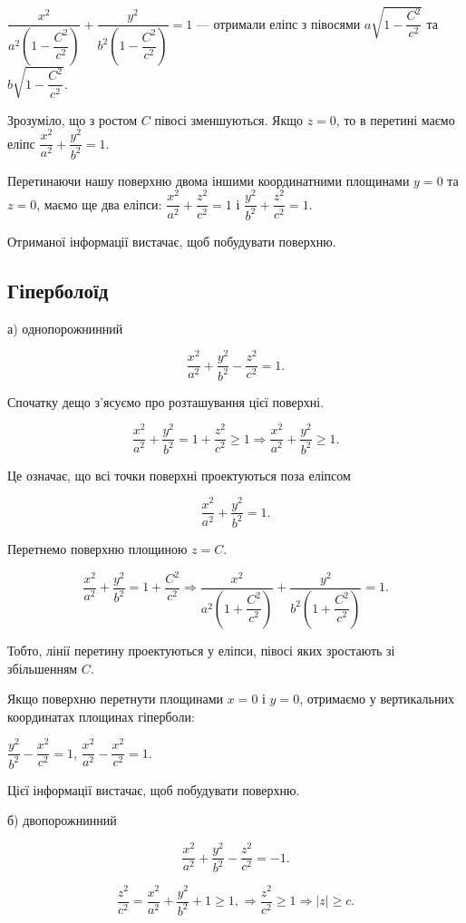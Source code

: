 $\dfrac{x^2}{a^2\left(1-\dfrac{C^2}{c^2}\right)} + \dfrac{y^2}{b^2\left(1-\dfrac{C^2}{c^2}\right)} = 1$ ---
отримали еліпс з півосями $a\sqrt{1 - \dfrac{C^2}{c^2}}$ та $b\sqrt{1 - \dfrac{C^2}{c^2}}$.


Зрозуміло, що з ростом $C$ півосі зменшуються. Якщо $z = 0$, то в
перетині маємо еліпс $\dfrac{x^2}{a^2} + \dfrac{y^2}{b^2} = 1$.


Перетинаючи нашу поверхню двома іншими координатними площинами
$y = 0$ та $z = 0$, маємо ще два еліпси: $\dfrac{x^2}{a^2} + \dfrac{z^2}{c^2} = 1$
і $\dfrac{y^2}{b^2} + \dfrac{z^2}{c^2} = 1$.

Отриманої інформації вистачає,
щоб побудувати поверхню.


\subsection{Гіперболоїд}

а) однопорожнинний

$$\dfrac{x^2}{a^2} + \dfrac{y^2}{b^2} - \dfrac{z^2}{c^2} = 1.$$

Спочатку дещо з’ясуємо про розташування цієї поверхні.

$$\dfrac{x^2}{a^2} + \dfrac{y^2}{b^2} = 1 + \dfrac{z^2}{c^2} \geqslant 1 \Rightarrow \dfrac{x^2}{a^2} + \dfrac{y^2}{b^2} \geqslant 1.$$

Це означає, що всі точки поверхні проектуються поза еліпсом

$$\dfrac{x^2}{a^2} + \dfrac{y^2}{b^2} = 1.$$

Перетнемо поверхню площиною $z = C$. 

$$\dfrac{x^2}{a^2} + \dfrac{y^2}{b^2} = 1 + \dfrac{C^2}{c^2} \Rightarrow 
\dfrac{x^2}{a^2\left(1+\dfrac{C^2}{c^2}\right)} + \dfrac{y^2}{b^2\left(1+\dfrac{C^2}{c^2}\right)} = 1.$$


Тобто, лінії перетину проектуються у еліпси, півосі яких зростають зі
збільшенням $C$.

Якщо поверхню перетнути площинами $x = 0$ і $y = 0$, отримаємо у
вертикальних координатах площинах гіперболи: 

$\dfrac{y^2}{b^2} - \dfrac{x^2}{c^2} = 1$, $\dfrac{x^2}{a^2} - \dfrac{x^2}{c^2} = 1$.


Цієї інформації вистачає, щоб побудувати поверхню.


б) двопорожнинний

$$\dfrac{x^2}{a^2} + \dfrac{y^2}{b^2} - \dfrac{z^2}{c^2} = -1.$$

$$\dfrac{z^2}{c^2} = \dfrac{x^2}{a^2} + \dfrac{y^2}{b^2} + 1 \geqslant 1, \Rightarrow
\dfrac{z^2}{c^2} \geqslant 1 \Rightarrow |z| \geqslant c.$$

